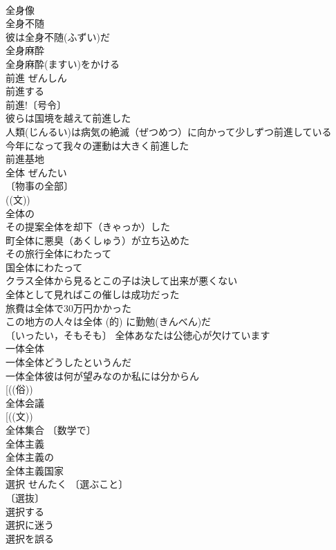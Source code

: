 \documentclass[8pt]{extreport}
\begin{document}
\begin{CJK}{UTF8}{min}
\\	全身像 
\\	全身不随 
\\	彼は全身不随(ふずい)だ 
\\	全身麻酔 
\\	全身麻酔(ますい)をかける 
\\	前進	ぜんしん	
\\	前進する 
\\	前進!〔号令〕 
\\	彼らは国境を越えて前進した 
\\	人類(じんるい)は病気の絶滅（ぜつめつ）に向かって少しずつ前進している 
\\	今年になって我々の運動は大きく前進した 
\\	前進基地 
\\	全体	ぜんたい	
\\	〔物事の全部〕
\\	((文)) 
\\	全体の 
\\	その提案全体を却下（きゃっか）した 
\\	町全体に悪臭（あくしゅう）が立ち込めた 
\\	その旅行全体にわたって 
\\	国全体にわたって 
\\	クラス全体から見るとこの子は決して出来が悪くない 
\\	全体として見ればこの催しは成功だった 
\\	旅費は全体で30万円かかった 
\\	この地方の人々は全体 (的) に勤勉(きんべん)だ 
\\	〔いったい，そもそも〕 全体あなたは公徳心が欠けています 
\\	一体全体 
\\	一体全体どうしたというんだ 
\\	一体全体彼は何が望みなのか私には分からん 
\\	[((俗))
\\	全体会議 
\\	[((文)) 
\\	全体集合 〔数学で〕
\\	全体主義 
\\	全体主義の 
\\	全体主義国家 
\\	選択	せんたく	〔選ぶこと〕
\\	〔選抜〕
\\	選択する 
\\	選択に迷う 
\\	選択を誤る 

\end{CJK}
\end{document}
